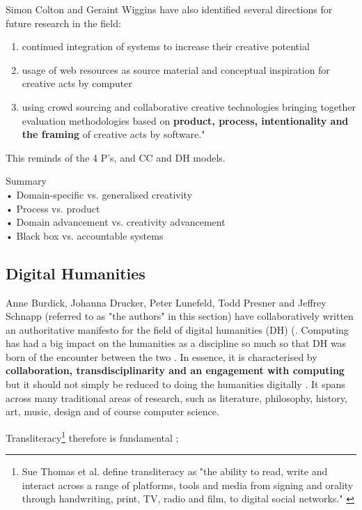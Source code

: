 Simon Colton and Geraint Wiggins have also identified several directions for future research in the field: \citep[p.5]{Colton2012}

\begin{enumerate}
\item continued integration of systems to increase their creative potential
\item usage of web resources as source material and conceptual inspiration for creative acts by computer
\item using crowd sourcing and collaborative creative technologies
bringing together evaluation methodologies based on \textbf{product, process, intentionality and the framing} of creative acts by software." \citep[p.5]{Colton2012}
\end{enumerate}

\begin{draft}
This reminds of the 4 P’s, and CC and DH models.
\end{draft}

\begin{shaded}
Summary\\
•	Domain-specific vs. generalised creativity\\
•	Process vs. product\\
•	Domain advancement vs. creativity advancement\\
•	Black box vs. accountable systems
\end{shaded}

\subsection{Digital Humanities}

Anne Burdick, Johanna Drucker, Peter Lunefeld, Todd Presner and Jeffrey Schnapp (referred to as "the authors" in this section) have collaboratively written an authoritative manifesto for the field of digital humanities (DH) (\citep{Burdick2012}. Computing has had a big impact on the humanities as a discipline so much so that DH was born of the encounter between the two \citep[p.3]{Burdick2012}. In essence, it is characterised by \textbf{collaboration, transdisciplinarity and an engagement with computing} \citep[p.122]{Burdick2012} but it should not simply be reduced to doing the humanities digitally \citep[p.101]{Burdick2012}. It spans across many traditional areas of research, such as literature, philosophy, history, art, music, design and of course computer science.

\begin{draft}
Transliteracy\footnote{Sue Thomas et al. define transliteracy as "the ability to read, write and interact across a range of platforms, tools and media from signing and orality through handwriting, print, TV, radio and film, to digital social networks." \citep{Thomas2007}} therefore is fundamental \citep{Thomas2007};
\end{draft}


